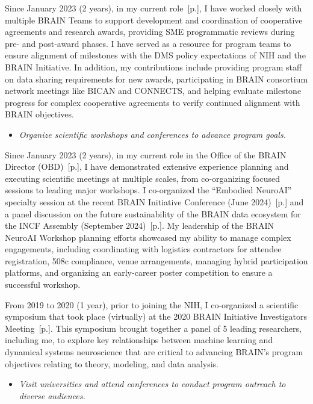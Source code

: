 \documentclass[10pt]{article}
\newcommand{\see}[1]{[\textcolor{hopkinsblue}{p.\pageref{sec:#1}}]}
\begin{document}
Since January 2023 (2 years), in my current role~\see{jobobd}, I have worked
closely with multiple BRAIN Teams to support development and coordination of
cooperative agreements and research awards, providing SME programmatic reviews
during pre- and post-award phases. I have served as a resource for program
teams to ensure alignment of milestones with the DMS policy expectations of
NIH and the BRAIN Initiative. In addition, my contributions include providing
program staff on data sharing requirements for new awards, participating in
BRAIN consortium network meetings like BICAN and CONNECTS, and helping evaluate
milestone progress for complex cooperative agreements to verify continued
alignment with BRAIN objectives.

\begin{itemize}
  \color{hopkinsblue}
  \item \emph{Organize scientific workshops and conferences to advance program goals.}
\end{itemize}

Since January 2023 (2 years), in my current role in the Office of the BRAIN
Director (OBD)~\see{jobobd}, I have demonstrated extensive experience planning
and executing scientific meetings at multiple scales, from co-organizing
focused sessions to leading major workshops. I co-organized the ``Embodied
NeuroAI'' specialty session at the recent BRAIN Initiative Conference (June
2024)~\see{natltalks} and a panel discussion on the future sustainability of the
BRAIN data ecosystem for the INCF Assembly (September 2024)~\see{intltalks}. My
leadership of the BRAIN NeuroAI Workshop planning efforts showcased my ability
to manage complex engagements, including coordinating with logistics contractors
for attendee registration, 508c compliance, venue arrangements, managing hybrid
participation platforms, and organizing an early-career poster competition to
ensure a successful workshop.

From 2019 to 2020 (1 year), prior to joining the NIH, I co-organized a
scientific symposium that took place (virtually) at the 2020 BRAIN Initiative
Investigators Meeting~\see{symposium}. This symposium brought together a panel
of 5 leading researchers, including me, to explore key relationships between
machine learning and dynamical systems neuroscience that are critical to
advancing BRAIN's program objectives relating to theory, modeling, and data
analysis.

\begin{itemize}
  \color{hopkinsblue}
  \item \emph{Visit universities and attend conferences to conduct program
outreach to diverse audiences.}
\end{itemize}
\end{document}
